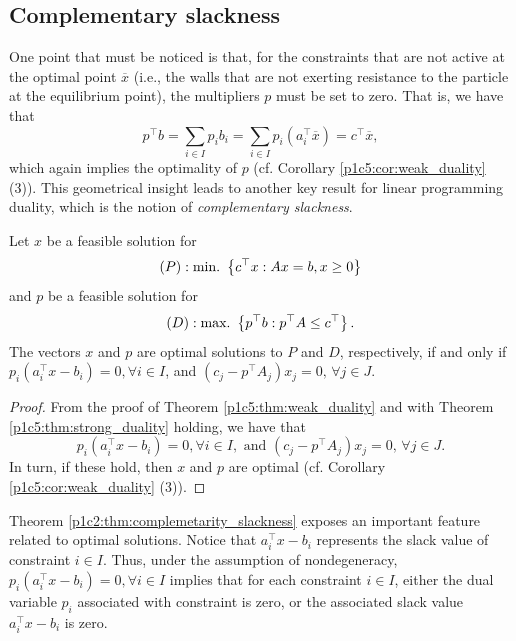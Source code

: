 \subsection{Complementary slackness}

One point that must be noticed is that, for the constraints that are not active at the optimal point $\overline{x}$ (i.e., the walls that are not exerting resistance to the particle at the equilibrium point), the multipliers $p$ must be set to zero. That is, we have that
%
\begin{equation*}
	p^\top b  = \sum_{i \in I} p_ib_i = \sum_{i \in I} p_i(a_i^\top\overline{x}) = c^\top \overline{x},	
\end{equation*}
%
which again implies the optimality of $p$ (cf. Corollary \ref{p1c5:cor:weak_duality} (3)). This geometrical insight leads to another key result for linear programming duality, which is the notion of \emph{complementary slackness}.

\begin{theorem}\label{p1c2:thm:complemetarity_slackness}
	Let $x$ be a feasible solution for 
	\begin{equation*}
		(P) : \mathop{\text{min.~}}\left\{ c^\top x : Ax = b, x \geq 0 \right \}	
	\end{equation*}
	and $p$ be a feasible solution for 
	\begin{equation*}
		(D) : \mathop{\text{max.~}}\left\{ p^\top b : p^\top A \leq c^\top \right \}. 	
	\end{equation*}
	The vectors $x$ and $p$ are optimal solutions to $P$ and $D$, respectively, if and only if
	$p_i(a_i^\top x - b_i) = 0, \forall i \in I$, and $(c_j - p^\top A_j)x_j = 0, \, \forall j \in J$. 
\end{theorem}

\begin{proof} 
	From the proof of Theorem \ref{p1c5:thm:weak_duality} and with Theorem \ref{p1c5:thm:strong_duality} holding, we have that 
%
	\begin{equation*}
		p_i(a_i^\top x - b_i) = 0, \forall i \in I, \text{ and } 	
	(c_j - p^\top A_j)x_j = 0, \, \forall j \in J.
	\end{equation*}
%
	In turn, if these hold, then $x$ and $p$ are optimal (cf. Corollary \ref{p1c5:cor:weak_duality} (3)). 
\end{proof}

Theorem \ref{p1c2:thm:complemetarity_slackness} exposes an important feature related to optimal solutions. Notice that $a_i^\top x - b_i$ represents the slack value of constraint $i \in I$. Thus, under the assumption of nondegeneracy, $p_i(a_i^\top x - b_i) = 0, \forall i \in I$ implies that for each constraint $i \in I$, either the dual variable $p_i$ associated with constraint is zero, or the associated slack value $a_i^\top x - b_i$ is zero. 

